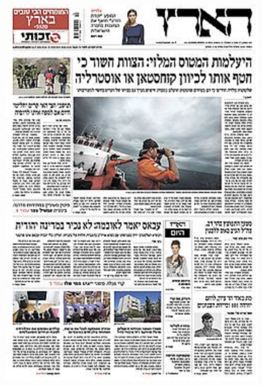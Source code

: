 \documentclass{book}
\begin{document}
\begin{figure}[H]
\begin{center}
\includegraphics[scale=0.05]{../test/hebraic.jpg}

\end{center}
\end{figure}
\end{document}
